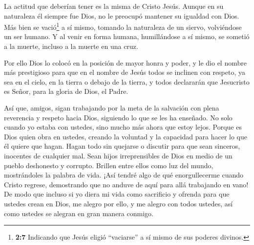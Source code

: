  La actitud que deberían tener es la misma de Cristo Jesús.
 Aunque en su naturaleza él siempre fue Dios, no le preocupó
mantener su igualdad con Dios.  Más bien se vació\footnote{\textbf{2:7}
  Indicando que Jesús eligió ``vaciarse'' a sí mismo de sus poderes
  divinos.} a sí mismo, tomando la naturaleza de un siervo, volviéndose
un ser humano.  Y al venir en forma humana, humillándose a
sí mismo, se sometió a la muerte, incluso a la muerte en una cruz.

 Por ello Dios lo colocó en la posición de mayor honra y
poder, y le dio el nombre más prestigioso  para que en el
nombre de Jesús todos se inclinen con respeto, ya sea en el cielo, en la
tierra o debajo de la tierra,  y todos declararán que
Jesucristo es Señor, para la gloria de Dios, el Padre.

 Así que, amigos, sigan trabajando por la meta de la
salvación con plena reverencia y respeto hacia Dios, siguiendo lo que se
les ha enseñado. No solo cuando yo estaba con ustedes, sino mucho más
ahora que estoy lejos.  Porque es Dios quien obra en
ustedes, creando la voluntad y la capacidad para hacer lo que él quiere
que hagan.  Hagan todo sin quejarse o discutir
 para que sean sinceros, inocentes de cualquier mal. Sean
hijos irreprensibles de Dios en medio de un pueblo deshonesto y
corrupto. Brillen entre ellos como luz del mundo, 
mostrándoles la palabra de vida. ¡Así tendré algo de qué enorgullecerme
cuando Cristo regrese, demostrando que no anduve de aquí para allá
trabajando en vano!  De modo que incluso si yo diera mi
vida como sacrificio y ofrenda para que ustedes crean en Dios, me alegro
por ello, y me alegro con todos ustedes,  así como ustedes
se alegran en gran manera conmigo.

